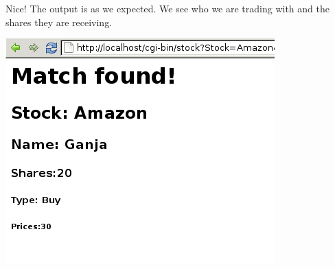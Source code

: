 Nice! The output is as we expected. We see who we are trading with and the shares they are receiving.

 
\includegraphics[scale=0.5]{../test7.png}
 